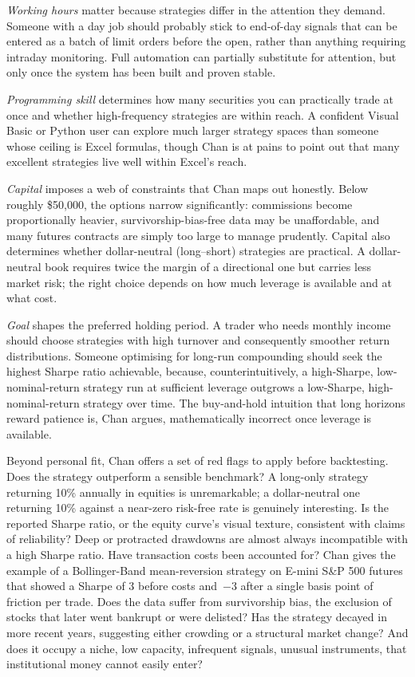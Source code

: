 \documentclass[12pt, a4paper]{article}
\begin{document}
\textit{Working hours} matter because strategies differ in the attention they demand. Someone with a day job should probably stick to end-of-day signals that can be entered as a batch of limit orders before the open, rather than anything requiring intraday monitoring. Full automation can partially substitute for attention, but only once the system has been built and proven stable.

\textit{Programming skill} determines how many securities you can practically trade at once and whether high-frequency strategies are within reach. A confident Visual Basic or Python user can explore much larger strategy spaces than someone whose ceiling is Excel formulas, though Chan is at pains to point out that many excellent strategies live well within Excel's reach.

\textit{Capital} imposes a web of constraints that Chan maps out honestly. Below roughly \$50,000, the options narrow significantly: commissions become proportionally heavier, survivorship-bias-free data may be unaffordable, and many futures contracts are simply too large to manage prudently. Capital also determines whether dollar-neutral (long--short) strategies are practical. A dollar-neutral book requires twice the margin of a directional one but carries less market risk; the right choice depends on how much leverage is available and at what cost.

\textit{Goal} shapes the preferred holding period. A trader who needs monthly income should choose strategies with high turnover and consequently smoother return distributions. Someone optimising for long-run compounding should seek the highest Sharpe ratio achievable, because, counterintuitively, a high-Sharpe, low-nominal-return strategy run at sufficient leverage outgrows a low-Sharpe, high-nominal-return strategy over time. The buy-and-hold intuition that long horizons reward patience is, Chan argues, mathematically incorrect once leverage is available.

Beyond personal fit, Chan offers a set of red flags to apply before backtesting. Does the strategy outperform a sensible benchmark? A long-only strategy returning 10\% annually in equities is unremarkable; a dollar-neutral one returning 10\% against a near-zero risk-free rate is genuinely interesting. Is the reported Sharpe ratio, or the equity curve's visual texture, consistent with claims of reliability? Deep or protracted drawdowns are almost always incompatible with a high Sharpe ratio. Have transaction costs been accounted for? Chan gives the example of a Bollinger-Band mean-reversion strategy on E-mini S\&P 500 futures that showed a Sharpe of 3 before costs and~$-3$ after a single basis point of friction per trade. Does the data suffer from survivorship bias, the exclusion of stocks that later went bankrupt or were delisted? Has the strategy decayed in more recent years, suggesting either crowding or a structural market change? And does it occupy a niche, low capacity, infrequent signals, unusual instruments, that institutional money cannot easily enter?
\end{document}
